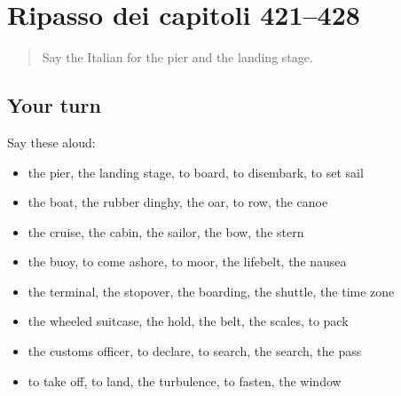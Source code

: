 \section[(dialogue)]{Ripasso dei capitoli 421–428}

\label{lesson:IT-R428-ripasso-421-428}



\begin{quote}
Say the Italian for the pier and the landing stage.
\end{quote}

\subsection*{Your turn}
Say these aloud:

\begin{itemize}
\raggedright
  \item the pier, the landing stage, to board, to disembark, to set sail
  \item the boat, the rubber dinghy, the oar, to row, the canoe
  \item the cruise, the cabin, the sailor, the bow, the stern
  \item the buoy, to come ashore, to moor, the lifebelt, the nausea
  \item the terminal, the stopover, the boarding, the shuttle, the time zone
  \item the wheeled suitcase, the hold, the belt, the scales, to pack
  \item the customs officer, to declare, to search, the search, the pass
  \item to take off, to land, the turbulence, to fasten, the window
\end{itemize}

